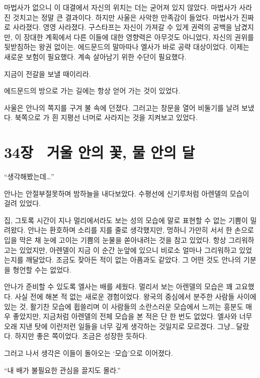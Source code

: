 마법사가 없으니 이 대결에서 자신의 위치는 더는 굳어져 있지 않았다. 마법사가 사라진 것치고는 정말 큰 결과이다. 하지만 사울은 사악한 만족감이 들었다. 마법사가 진짜로 사라졌다. 영영 사라졌다. 구스타프는 자신이 가져갈 수 있게 권력의 공백을 남겼지만, 이 장대한 계획에서 다른 이들에 대한 영향력은 아무것도 아니었다, 자신의 권위를 뒷받침하는 왕권 없이는. 에드문드의 말마따나 엘사가 바로 공략 대상이었다. 이제는 새로운 보험이 필요했다. 계속 살아남기 위한 수단이 필요했다.

지금이 전갈을 보낼 때이리라.

에드문드의 방으로 가는 길에는 항상 얻어 가는 것이 있었다.

사울은 안나의 쪽지를 구겨 불 속에 던졌다. 그러고는 창문을 열어 비둘기를 날려 보냈다. 북쪽으로 가 흰 지평선 너머로 사라지는 것을 지켜보고 있었다.



\chapter[34장  거울 안의 꽃, 물 안의 달][34장\hspace*{.5em}거울 안의 꽃, 물 안의 달]{34장 \ 거울 안의 꽃, 물 안의 달}



\forceindent``생각해봤는데\ldots''

안나는 안절부절못하며 밤하늘을 내다보았다. 수평선에 신기루처럼 아렌델의 모습이 걸려 있었다.

집, 그토록 시간이 지나 멀리에서라도 보는 성의 모습에 말로 표현할 수 없는 기쁨이 밀려왔다. 안나는 환호하며 소리를 지를 줄로 생각했지만, 멍하니 가만히 서서 한 손으로 입을 막은 채 눈에 고이는 기쁨의 눈물을 쏟아내려는 것을 참고 있었다. 항상 그리워하고는 있었지만, 아렌델이 지금 이 순간 눈앞에 있으니 비로소 얼마나 그리워하고 있었는지를 깨달았다. 조금도 잦아든 적이 없는 아픔과도 같았다. 그 어떤 것도 안나의 기분을 형언할 수는 없었다.

안나가 준비할 수 있도록 엘사는 배를 세웠다. 멀리서 보는 아렌델의 모습은 꽤 고요했다. 사실 전에 해본 적 없는 새로운 경험이었다. 왕국의 중심에서 분주한 사람들 사이에 있는 것, 활기찬 모습에 휩쓸리며 이 사람들의 소란스러운 모습에서 느끼는 흥분도 매우 좋았지만, 지금처럼 아렌델의 전체 모습을 본 적은 단 한 번도 없었다. 엘사와 너무 오래 지낸 탓에 이런저런 일들을 너무 깊게 생각하는 것일지로 모르겠다. 그냥\ldots\,달랐다. 하지만 좋은 쪽이었다. 조금은 성장한 듯하다.

그러고 나서 생각은 이들이 돌아오는 `모습'으로 이어졌다.

``내 배가 불필요한 관심을 끌지도 몰라.''

